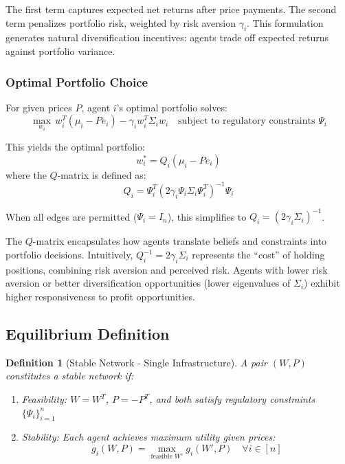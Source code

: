 \documentclass[12pt]{article}
\newtheorem{definition}[theorem]{Definition}
\begin{document}
The first term captures expected net returns after price payments. The second term penalizes portfolio risk, weighted by risk aversion $\gamma_i$. This formulation generates natural diversification incentives: agents trade off expected returns against portfolio variance.

\subsubsection{Optimal Portfolio Choice}

For given prices $P$, agent $i$'s optimal portfolio solves:
\begin{equation}
\max_{w_i} \, w_i^T(\mu_i - Pe_i) - \gamma_i w_i^T \Sigma_i w_i \quad \text{subject to regulatory constraints } \Psi_i
\end{equation}

This yields the optimal portfolio:
\begin{equation}
w_i^* = Q_i(\mu_i - Pe_i)
\label{eq:optimal_portfolio_single}
\end{equation}
where the $Q$-matrix is defined as:
\begin{equation}
Q_i = \Psi_i^T(2\gamma_i\Psi_i\Sigma_i\Psi_i^T)^{-1}\Psi_i
\label{eq:Q_matrix_single}
\end{equation}

When all edges are permitted ($\Psi_i = I_n$), this simplifies to $Q_i = (2\gamma_i\Sigma_i)^{-1}$.

The $Q$-matrix encapsulates how agents translate beliefs and constraints into portfolio decisions. Intuitively, $Q_i^{-1} = 2\gamma_i\Sigma_i$ represents the ``cost'' of holding positions, combining risk aversion and perceived risk. Agents with lower risk aversion or better diversification opportunities (lower eigenvalues of $\Sigma_i$) exhibit higher responsiveness to profit opportunities.

\subsection{Equilibrium Definition}

\begin{definition}[Stable Network - Single Infrastructure]
A pair $(W, P)$ constitutes a \textit{stable network} if:
\begin{enumerate}[noitemsep]
    \item Feasibility: $W = W^T$, $P = -P^T$, and both satisfy regulatory constraints $\{\Psi_i\}_{i=1}^n$
    \item Stability: Each agent achieves maximum utility given prices:
    \[
    g_i(W, P) = \max_{\text{feasible } W'} g_i(W', P) \quad \forall i \in [n]
    \]
\end{enumerate}
\end{definition}
\end{document}
